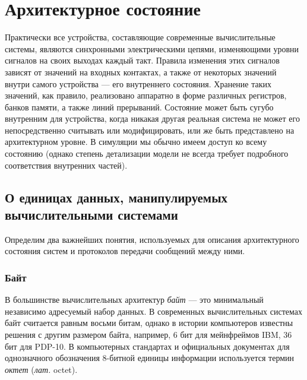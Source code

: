
\chapter{Архитектурное состояние}\label{state}


Практически все устройства, составляющие современные вычислительные системы, являются синхронными электрическими цепями, изменяющими уровни сигналов на своих выходах каждый такт. Правила изменения этих сигналов зависят от значений на входных контактах, а также от некоторых значений внутри самого устройства — его внутреннего состояния. Хранение таких значений, как правило, реализовано аппаратно в форме различных регистров, банков памяти, а также линий прерываний. Состояние может быть сугубо внутренним для устройства, когда никакая другая реальная система не может его непосредственно считывать или модифицировать, или же быть представлено на архитектурном уровне. В симуляции мы обычно имеем доступ ко всему состоянию (однако степень детализации модели не всегда требует подробного соответствия внутренних частей).

\section[О единицах данных]{О единицах данных, манипулируемых вычислительными системами}

Определим два важнейших понятия, используемых для описания архитектурного состояния систем и протоколов передачи сообщений между ними.

\subsection{Байт}
В большинстве вычислительных архитектур \textit{байт} — это минимальный независимо адресуемый набор данных. В современных вычислительных системах байт считается равным восьми битам, однако в истории компьютеров известны решения с другим размером байта, например, 6 бит для мейнфреймов IBM, 36 бит для PDP-10. В компьютерных стандартах и официальных документах для однозначного обозначения 8-битной единицы информации используется термин \textit{октет} (\textit{лат.} octet).

